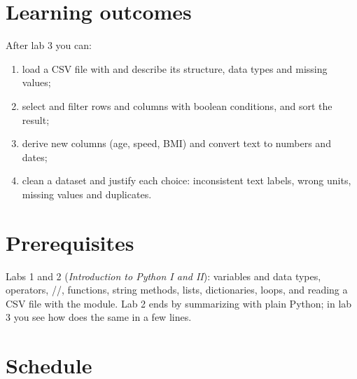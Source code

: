 \documentclass[11pt,a4paper]{article}
\begin{document}



\section{Learning outcomes}

After lab 3 you can:

\begin{enumerate}[label=\textbf{LO\arabic*}, leftmargin=1.4cm]
  \item load a CSV file with  and describe its structure,
        data types and missing values;
  \item select and filter rows and columns with boolean conditions, and
        sort the result;
  \item derive new columns (age, speed, BMI) and convert text to numbers
        and dates;
  \item clean a dataset and justify each choice: inconsistent text
        labels, wrong units, missing values and duplicates.
\end{enumerate}

\section{Prerequisites}

Labs 1 and 2 (\emph{Introduction to Python I and II}): variables and data
types, operators, //, functions, string
methods, lists, dictionaries, loops, and reading a CSV file with the
 module. Lab 2 ends by summarizing  with
plain Python; in lab 3 you see how  does the same in a few
lines.





\section{Schedule}
\end{document}
